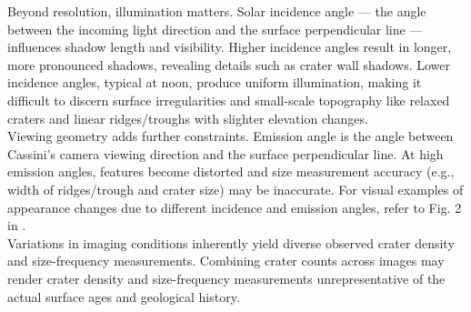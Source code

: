 \documentclass[preprint,11pt,3p,times,authoryear]{elsarticle}
\begin{document}
Beyond resolution, illumination matters. Solar incidence angle — the angle between the incoming light direction and the surface perpendicular line — influences shadow length and visibility. Higher incidence angles result in longer, more pronounced shadows, revealing details such as crater wall shadows. Lower incidence angles, typical at noon, produce uniform illumination, making it difficult to discern surface irregularities and small-scale topography like relaxed craters and linear ridges/troughs with slighter elevation changes.\\

Viewing geometry adds further constraints. Emission angle is the angle between Cassini's camera viewing direction and the surface perpendicular line. At high emission angles, features become distorted and size measurement accuracy (e.g., width of ridges/trough and crater size) may be inaccurate. For visual examples of appearance changes due to different incidence and emission angles, refer to Fig. 2 in \citet{Bland2018}.\\

Variations in imaging conditions inherently yield diverse observed crater density and size-frequency measurements. Combining crater counts across images may render crater density and size-frequency measurements unrepresentative of the actual surface ages and geological history.\\
\end{document}
